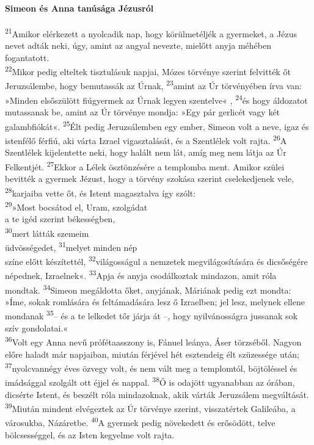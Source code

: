 \documentclass[10pt]{article}
\begin{document}
\begin{multicols}{2}
\paragraph*{Simeon és Anna tanúsága Jézusról}
\textsuperscript{21}Amikor elérkezett a nyolcadik nap, hogy körülmetéljék a gyermeket, a Jézus nevet adták neki, úgy, amint az angyal nevezte, mielőtt anyja méhében fogantatott. \\  
\textsuperscript{22}Mikor pedig elteltek tisztulásuk napjai, Mózes törvénye szerint felvitték őt Jeruzsálembe, hogy bemutassák az Úrnak,  
\textsuperscript{23}amint az Úr törvényében írva van: »Minden elsőszülött fiúgyermek az Úrnak legyen szentelve« ,  
\textsuperscript{24}és hogy áldozatot mutassanak be, amint az Úr törvénye mondja: »Egy pár gerlicét vagy két galambfiókát«.  
\textsuperscript{25}Élt pedig Jeruzsálemben egy ember, Simeon volt a neve, igaz és istenfélő férfiú, aki várta Izrael vigasztalását, és a Szentlélek volt rajta.  
\textsuperscript{26}A Szentlélek kijelentette neki, hogy halált nem lát, amíg meg nem látja az Úr Felkentjét.  
\textsuperscript{27}Ekkor a Lélek ösztönzésére a templomba ment. Amikor szülei bevitték a gyermek Jézust, hogy a törvény szokása szerint cselekedjenek vele,  
\textsuperscript{28}karjaiba vette őt, és Istent magasztalva így szólt: \\  
\textsuperscript{29}»Most bocsátod el, Uram, szolgádat \\ a te igéd szerint békességben, \\  
\textsuperscript{30}mert látták szemeim \\ üdvösségedet,  
\textsuperscript{31}melyet minden nép \\ színe előtt készítettél,  
\textsuperscript{32}világosságul a nemzetek megvilágosítására és dicsőségére népednek, Izraelnek«.  
\textsuperscript{33}Apja és anyja csodálkoztak mindazon, amit róla mondtak.  
\textsuperscript{34}Simeon megáldotta őket, anyjának, Máriának pedig ezt mondta: »Íme, sokak romlására és feltámadására lesz ő Izraelben; jel lesz, melynek ellene mondanak  
\textsuperscript{35}– és a te lelkedet tőr járja át –, hogy nyilvánosságra jussanak sok szív gondolatai.« \\  
\textsuperscript{36}Volt egy Anna nevű prófétaasszony is, Fánuel leánya, Áser törzséből. Nagyon előre haladt már napjaiban, miután férjével hét esztendeig élt szüzessége után;  
\textsuperscript{37}nyolcvannégy éves özvegy volt, és nem vált meg a templomtól, böjtöléssel és imádsággal szolgált ott éjjel és nappal.  
\textsuperscript{38}Ő is odajött ugyanabban az órában, dicsérte Istent, és beszélt róla mindazoknak, akik várták Jeruzsálem megváltását. \\  
\textsuperscript{39}Miután mindent elvégeztek az Úr törvénye szerint, visszatértek Galileába, a városukba, Názáretbe.  
\textsuperscript{40}A gyermek pedig növekedett és erősödött, telve bölcsességgel, és az Isten kegyelme volt rajta.

\end{multicols}
\end{document}
